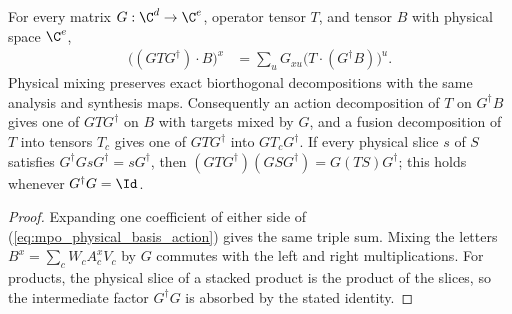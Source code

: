 \begin{lemma}
    \label{thm:mpo_physical_basis_action}
    \leanok
    For every matrix $G:\C^d\to\C^e$, operator tensor $T$, and tensor $B$
    with physical space $\C^e$,
    \begin{align}
        \bigl((GTG^\dagger)\cdot B\bigr)^x
         & =\sum_uG_{xu}\bigl(T\cdot(G^\dagger B)\bigr)^u.
        \label{eq:mpo_physical_basis_action}
    \end{align}
    Physical mixing preserves exact biorthogonal decompositions with the
    same analysis and synthesis maps. Consequently an action
    decomposition of $T$ on $G^\dagger B$ gives one of $GTG^\dagger$ on
    $B$ with targets mixed by $G$, and a fusion decomposition of $T$
    into tensors $T_c$ gives one of $GTG^\dagger$ into $GT_cG^\dagger$.
    If every physical slice $s$ of $S$ satisfies
    $G^\dagger GsG^\dagger=sG^\dagger$, then
    $(GTG^\dagger)(GSG^\dagger)=G(TS)G^\dagger$; this holds whenever
    $G^\dagger G=\Id$.
\end{lemma}
\begin{proof}
    \leanok
    Expanding one coefficient of either side of
    (\ref{eq:mpo_physical_basis_action}) gives the same triple sum.
    Mixing the letters $B^x=\sum_cW_cA_c^xV_c$ by $G$ commutes with the
    left and right multiplications. For products, the physical slice of
    a stacked product is the product of the slices, so the intermediate
    factor $G^\dagger G$ is absorbed by the stated identity.
\end{proof}

